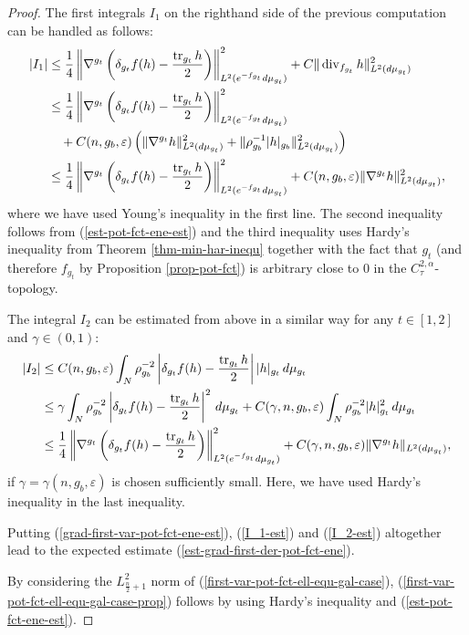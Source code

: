 \documentclass[a4paper,11pt,reqno]{amsart}
\def\tr{\mathop{\rm tr}\nolimits}
\def\div{\mathop{\rm div}\nolimits}
\def\tr{\mathop{\rm tr}\nolimits}
\def\div{\mathop{\rm div}\nolimits}
\numberwithin{equation}{section}
\begin{document}
\begin{proof}
		The first integrals $I_1$ on the righthand side of the previous computation can be handled as follows:
		\begin{equation}
		\begin{split}\label{I_1-est}
		|I_1|&\leq \frac{1}{4}\left\|\nabla^{g_t}\left(\delta_{g_t}f(h)-\frac{\tr_{g_t}h}{2}\right)\right\|^2_{L^2(e^{-f_{g_t}}d\mu_{g_t})}+C\|\div_{f_{g_t}}h\|^2_{L^2(d\mu_{g_t})}\\
		&\leq \frac{1}{4}\left\|\nabla^{g_t}\left(\delta_{g_t}f(h)-\frac{\tr_{g_t}h}{2}\right)\right\|^2_{L^2(e^{-f_{g_t}}d\mu_{g_t})}\\
		&\quad+C(n,g_b,\varepsilon)\left(\|\nabla^{g_t}h\|^2_{L^2(d\mu_{g_t})}+\|\rho_{g_b}^{-1}|h|_{g_b}\|_{L^2(d\mu_{g_t})}^2\right)\\
		&\leq \frac{1}{4}\left\|\nabla^{g_t}\left(\delta_{g_t}f(h)-\frac{\tr_{g_t}h}{2}\right)\right\|^2_{L^2(e^{-f_{g_t}}d\mu_{g_t})}+C(n,g_b,\varepsilon)\|\nabla^{g_t}h\|^2_{L^2(d\mu_{g_t})},
		\end{split}
		\end{equation}
		where we have used Young's inequality in the first line. The second inequality follows from (\ref{est-pot-fct-ene-est}) and the third inequality uses Hardy's inequality from Theorem \ref{thm-min-har-inequ} together with the fact that $g_t$ (and therefore $f_{g_t}$ by Proposition \ref{prop-pot-fct}) is arbitrary close to $0$ in the $C^{2,\alpha}_{\tau}$-topology.
		
		The integral $I_2$ can be estimated from above in a similar way for any $t\in[1,2]$ and $\gamma\in(0,1)$:
		\begin{equation}
		\begin{split}\label{I_2-est}
		|I_2|&\leq C(n,g_b,\varepsilon)\int_N\rho_{g_b}^{-2}\left|\delta_{g_t}f(h)-\frac{\tr_{g_t}h}{2}\right||h|_{g_t}\,d\mu_{g_t}\\
		&\leq \gamma \int_N\rho_{g_b}^{-2}\left|\delta_{g_t}f(h)-\frac{\tr_{g_t}h}{2}\right|^2\,d\mu_{g_t}+C(\gamma,n,g_b,\varepsilon)\int_N\rho_{g_b}^{-2}|h|^2_{g_t}\,d\mu_{g_t}\\
		&\leq \frac{1}{4}\left\|\nabla^{g_t}\left(\delta_{g_t}f(h)-\frac{\tr_{g_t}h}{2}\right)\right\|^2_{L^2(e^{-f_{g_t}}d\mu_{g_t})}+C(\gamma,n,g_b,\varepsilon)\|\nabla^{g_t}h\|_{L^2(d\mu_{g_t})},
		\end{split}
		\end{equation}
		if $\gamma=\gamma(n,g_b,\varepsilon)$ is chosen sufficiently small. Here, we have used Hardy's inequality in the last inequality.
		
		Putting (\ref{grad-first-var-pot-fct-ene-est}), (\ref{I_1-est}) and (\ref{I_2-est}) altogether lead to the expected estimate (\ref{est-grad-first-der-pot-fct-ene}).
		
		
		By considering the $L^2_{\frac{n}{2}+1}$ norm of (\ref{first-var-pot-fct-ell-equ-gal-case}), (\ref{first-var-pot-fct-ell-equ-gal-case-prop}) follows by using Hardy's inequality and (\ref{est-pot-fct-ene-est}).
	\end{proof}
	
\end{document}
